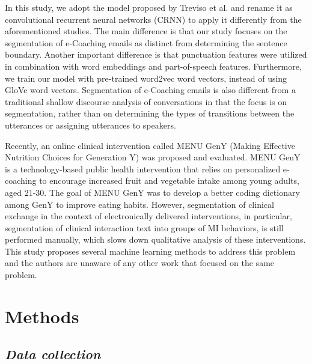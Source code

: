 \documentclass{amia}
\begin{document}
In this study, we adopt the model proposed by Treviso et al. \cite{treviso2017sentence} and rename it as convolutional recurrent neural networks (CRNN) to apply it differently from the aforementioned studies. The main difference is that our study focuses on the segmentation of e-Coaching emails as distinct from determining the sentence boundary. Another important difference is that punctuation features were utilized in combination with word embeddings and part-of-speech features. Furthermore, we train our model with pre-trained word2vec word vectors,\cite{mikolov2013distributed} instead of using GloVe word vectors. Segmentation of e-Coaching emails is also different from a traditional shallow discourse analysis of conversations \cite{galley2003discourse} in that the focus is on segmentation, rather than on determining the types of transitions between the utterances or assigning utterances to speakers.

Recently, an online clinical intervention called MENU GenY (Making Effective Nutrition Choices for Generation Y) was proposed and evaluated. \cite{alexander2017motivations} MENU GenY is a technology-based public health intervention that relies on personalized e-coaching to encourage increased fruit and vegetable intake among young adults, aged 21-30. The goal of MENU GenY was to develop a better coding dictionary among GenY to improve eating habits. However, segmentation of clinical exchange in the context of electronically delivered interventions, in particular, segmentation of clinical interaction text into groups of MI behaviors, is still performed manually, which slows down qualitative analysis of these interventions. This study proposes several machine learning methods to address this problem and the authors are unaware of any other work that focused on the same problem.  

\section*{Methods}
\subsection*{\textit{Data collection}}
\end{document}
